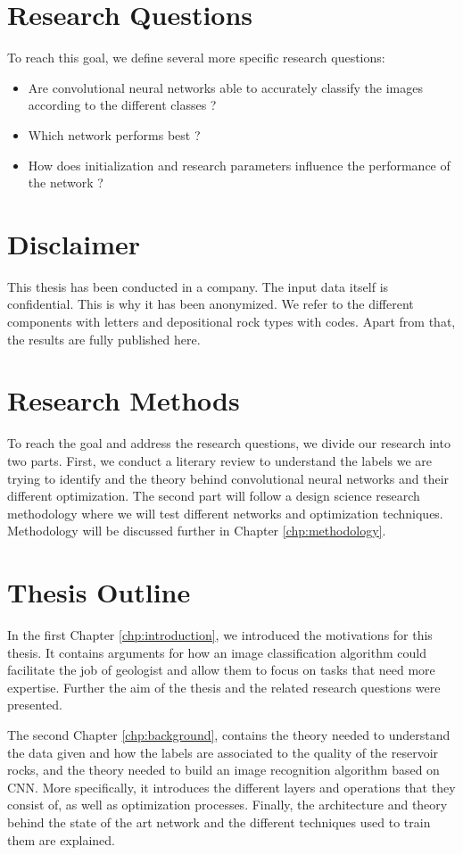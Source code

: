 \section{Research Questions}
To reach this goal, we define several more specific research questions: 
\begin{itemize}
    \item Are convolutional neural networks able to accurately classify the images according to the different classes ?
    \item Which network performs best ?
    \item How does initialization and research parameters influence the performance of the network ?
\end{itemize}

\section{Disclaimer}
This thesis has been conducted in a company. The input data itself is confidential. This is why it has been anonymized. We refer to the different components with letters and depositional rock types with codes. Apart from that, the results are fully published here.  

\section{Research Methods}\label{sec:research-method}
To reach the goal and address the research questions, we divide our research into two parts. First, we conduct a literary review to understand the labels we are trying to identify and the theory behind convolutional neural networks and their different optimization. The second part will follow a design science research methodology where we will test different networks and optimization techniques. Methodology will be discussed further in Chapter \ref{chp:methodology}.
\section{Thesis Outline}

In the first Chapter \ref{chp:introduction}, we introduced the motivations for this thesis. It contains arguments for how an image classification algorithm could facilitate the job of geologist and allow them to focus on tasks that need more expertise. Further the aim of the thesis and the related research questions were presented. 


The second Chapter \ref{chp:background}, contains the theory needed to understand the data given and how the labels are associated to the quality of the reservoir rocks, and the theory needed to build an image recognition algorithm based on CNN. More specifically, it introduces the different layers and operations that they consist of, as well as optimization processes. Finally, the architecture and theory behind the state of the art network and the different techniques used to train them are explained.
 

